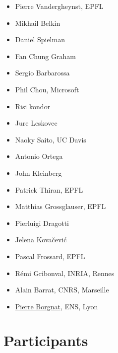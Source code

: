 \documentclass[a4paper]{scrartcl}
\begin{document}
\begin{itemize}
	\setlength{\itemsep}{0pt} \setlength{\parskip}{0pt}
	\item Pierre Vandergheynst, EPFL%
	\item Mikhail Belkin%
	\item Daniel Spielman%
	\item Fan Chung Graham%
	\item Sergio Barbarossa
	\item Phil Chou, Microsoft
	\item Risi kondor
	\item Jure Leskovec
	\item Naoky Saito, UC Davis
	\item Antonio Ortega
	\item John Kleinberg
	\item Patrick Thiran, EPFL
	\item Matthias Grossglauser, EPFL
	\item Pierluigi Dragotti %
	\item Jelena Kovačević %
	\item Pascal Frossard, EPFL %
	\item Rémi Gribonval, INRIA, Rennes
	\item Alain Barrat, CNRS, Marseille%
	\item \href{http://perso.ens-lyon.fr/pierre.borgnat/}{Pierre Borgnat}, ENS, Lyon
\end{itemize}

\section{Participants}
\end{document}
